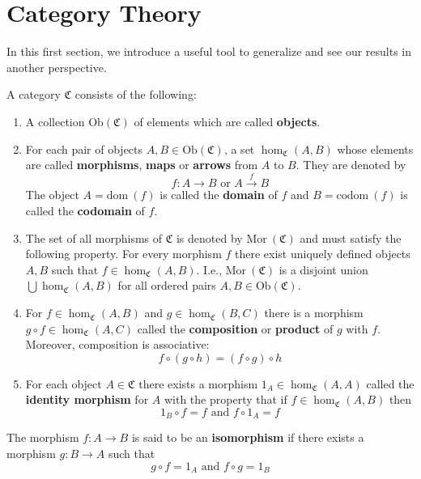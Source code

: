 \chapter{Category Theory}

In this first section, we introduce a useful tool to generalize and see our results in another perspective.

\begin{definition}[Category]
	A category $\mathfrak{C}$ consists of the following:
	\begin{enumerate}
		\item A collection $\text{Ob}(\mathfrak{C})$ of elements which are called \textbf{objects}.
		\item For each pair of objects $A, B \in \text{Ob}(\mathfrak{C})$, a set $\hom_{\mathfrak{C}}(A,B)$ whose elements are called \textbf{morphisms}, \textbf{maps} or \textbf{arrows} from $A$ to $B$. They are denoted by \[ f : A \longrightarrow B \text{ or } A \overset{f}{\longrightarrow} B \] The object $A = \text{dom}~(f)$ is called the \textbf{domain} of $f$ and $B = \text{codom}~(f)$ is called the \textbf{codomain} of $f$.
		\item The set of all morphisms of $\mathfrak{C}$ is denoted by $\text{Mor}~(\mathfrak{C})$ and must satisfy the following property. For every morphism $f$ there exist uniquely defined objects $A, B$ such that $f \in \hom_\mathfrak{C} (A,B)$. I.e., $\text{Mor}~(\mathfrak{C})$ is a disjoint union $\bigcup \hom_\mathfrak{C} (A,B)$ for all ordered pairs $A, B \in \text{Ob} (\mathfrak{C})$.
		\item For $f \in \hom_\mathfrak{C} (A,B)$ and $g \in \hom_\mathfrak{C} (B,C)$ there is a morphism $g \circ f \in \hom_\mathfrak{C} (A,C)$ called the \textbf{composition} or \textbf{product} of $g$ with $f$. Moreover, composition is associative: \[ f \circ (g \circ h) = (f \circ g) \circ h \]
		\item For each object $A \in \mathfrak{C}$ there exists a morphism $1_A \in \hom_\mathfrak{C} (A,A)$ called the \textbf{identity morphism} for $A$ with the property that if $f \in \hom_\mathfrak{C} (A,B)$ then \[ 1_B \circ f = f \text{ and } f \circ 1_A = f \]
	\end{enumerate}
\end{definition}

\begin{definition}
	The morphism $f : A \longrightarrow B$ is said to be an \textbf{isomorphism} if there exists a morphism $g : B \longrightarrow A$ such that
	\[
		g \circ f = 1_A \text{ and } f \circ g = 1_B
	\] 
\end{definition}

